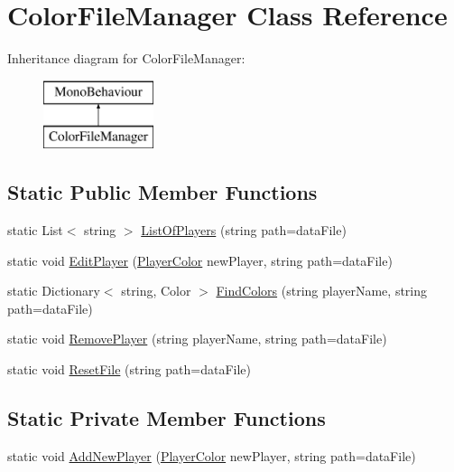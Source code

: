 \hypertarget{class_color_file_manager}{}\section{Color\+File\+Manager Class Reference}
\label{class_color_file_manager}
Inheritance diagram for Color\+File\+Manager\+:\begin{figure}[H]
\begin{center}
\leavevmode
\includegraphics[height=2.000000cm]{class_color_file_manager}
\end{center}
\end{figure}
\subsection*{Static Public Member Functions}
\begin{DoxyCompactItemize}
\item 
static List$<$ string $>$ \mbox{\hyperlink{class_color_file_manager_aa548375d447b63be2862d93dacca3b24}{List\+Of\+Players}} (string path=data\+File)
\item 
static void \mbox{\hyperlink{class_color_file_manager_a0fb905dacc59c730d20b2f29c7c348d6}{Edit\+Player}} (\mbox{\hyperlink{class_player_color}{Player\+Color}} new\+Player, string path=data\+File)
\item 
static Dictionary$<$ string, Color $>$ \mbox{\hyperlink{class_color_file_manager_a3836ee29f11c6a7fa60b1ae3c89582d5}{Find\+Colors}} (string player\+Name, string path=data\+File)
\item 
static void \mbox{\hyperlink{class_color_file_manager_a73094e85b36ea78788ee84733c419fbd}{Remove\+Player}} (string player\+Name, string path=data\+File)
\item 
static void \mbox{\hyperlink{class_color_file_manager_aa6497a46c4128d159552b65f1f675cfe}{Reset\+File}} (string path=data\+File)
\end{DoxyCompactItemize}
\subsection*{Static Private Member Functions}
\begin{DoxyCompactItemize}
\item 
static void \mbox{\hyperlink{class_color_file_manager_af4e55b402c15b046cd1933b32f410b94}{Add\+New\+Player}} (\mbox{\hyperlink{class_player_color}{Player\+Color}} new\+Player, string path=data\+File)
\end{DoxyCompactItemize}
